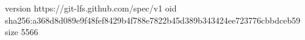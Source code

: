 version https://git-lfs.github.com/spec/v1
oid sha256:a368d8d089e9f48fef8429b4f788e7822b45d389b343424ee723776cbbdceb59
size 5566
